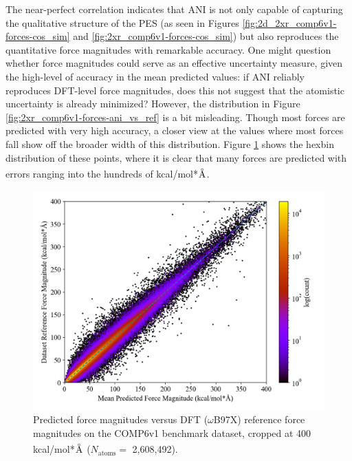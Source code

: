 The near-perfect correlation indicates that ANI is not only capable of capturing the qualitative structure of the PES (as seen in Figures \ref{fig:2d_2xr_comp6v1-forces-cos_sim} and \ref{fig:2xr_comp6v1-forces-cos_sim}) but also reproduces the quantitative force magnitudes with remarkable accuracy. 
One might question whether force magnitudes could serve as an effective uncertainty measure, given the high-level of accuracy in the mean predicted values: if ANI reliably reproduces DFT-level force magnitudes, does this not suggest that the atomistic uncertainty is already minimized? 
However, the distribution in Figure \ref{fig:2xr_comp6v1-forces-ani_vs_ref} is a bit misleading.
Though most forces are predicted with very high accuracy, a closer view at the values where most forces fall show off the broader width of this distribution.
Figure \ref{fig:2xr_comp6v1-forces-ani_vs_ref-cropped} shows the hexbin distribution of these points, where it is clear that many forces are predicted with errors ranging into the hundreds of kcal/mol*$\angstrom$.

\begin{figure}[H]
    \centering
    \includegraphics[width=1\linewidth]{Images/2xr_forces/zoomed_2xr_comp6v1_force-dft-vs-mean_ani.png}
    \caption[Cropped atomic force magnitude predictions versus DFT reference (COMP6v1)]{Predicted force magnitudes versus DFT ($\omega$B97X) reference force magnitudes on the COMP6v1 benchmark dataset, cropped at 400 kcal/mol*$\angstrom$ ($N_\text{atoms}=$ 2,608,492).}
    \label{fig:2xr_comp6v1-forces-ani_vs_ref-cropped}
\end{figure}

